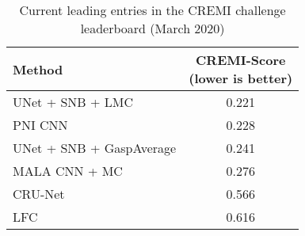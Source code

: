 \begin{table}[t]
\centering
\begin{minipage}[t]{0.65\textwidth}
    \centering
        \begin{tabular}[t]{l|c}
        Method & \makecell{CREMI-Score \\(lower is better)}  \\ \midrule
UNet + SNB + LMC \cite{bailoni2019generalized} &  0.221\\
PNI CNN \cite{lee2017superhuman} & 0.228 \\
UNet + SNB + GaspAverage \cite{bailoni2019generalized} & 0.241 \\
MALA CNN + MC \cite{funke2018large} & 0.276 \\
CRU-Net \cite{zeng2017deepem3d} & 0.566  \\
LFC \cite{parag2017anisotropic} & 0.616  \\
        \end{tabular}
        \vspace*{0.99em}
    \caption{Current leading entries  in the CREMI challenge leaderboard \cite{cremiChallenge} (March 2020)}
    \label{tab:test_results}
\end{minipage}
\end{table}
